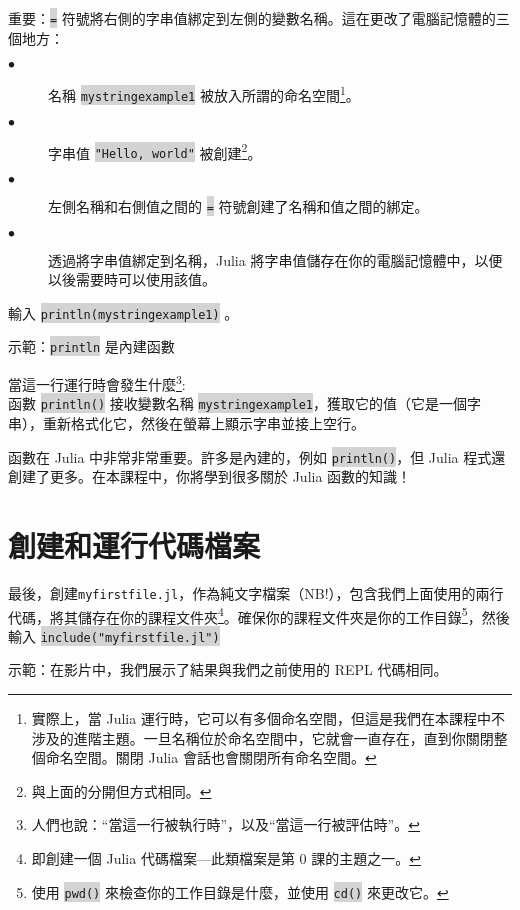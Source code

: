 \documentclass[]{article}
\newcommand{\codequote}[1]{\colorbox{lightgray}{\tt #1}}
\begin{document}
重要：\colorbox{lightgray}{\tt =} 符號將右側的字串值綁定到左側的變數名稱。這在更改了電腦記憶體的三個地方：
\begin{description}
	\item[$\bullet$] 名稱 \colorbox{lightgray}{\tt mystringexample1} 被放入所謂的命名空間\footnote{實際上，當 Julia 運行時，它可以有多個命名空間，但這是我們在本課程中不涉及的進階主題。一旦名稱位於命名空間中，它就會一直存在，直到你關閉整個命名空間。關閉 Julia 會話也會關閉所有命名空間。}。
  \item[$\bullet$] 字串值 \colorbox{lightgray}{\tt "Hello, world"} 被創建\footnote{ 與上面的分開但方式相同。}。
  \item[$\bullet$] 左側名稱和右側值之間的 \colorbox{lightgray}{\tt =} 符號創建了名稱和值之間的綁定。
 \item[$\bullet$] 透過將字串值綁定到名稱，Julia 將字串值儲存在你的電腦記憶體中，以便以後需要時可以使用該值。
\end{description}

\begin{minipage}{7cm}
輸入 \colorbox{lightgray}{\tt println(mystringexample1)} 。
\end{minipage}
\hspace{4em} \begin{minipage}{7cm}
	示範：\codequote{println} 是內建函數
\end{minipage}

當這一行運行時會發生什麼\footnote{人們也說：``當這一行被執行時''，以及``當這一行被評估時''。}:\\
函數 \colorbox{lightgray}{\tt println()} 接收變數名稱 \colorbox{lightgray}{\tt mystringexample1}，獲取它的值（它是一個字串），重新格式化它，然後在螢幕上顯示字串並接上空行。

函數在 Julia 中非常非常重要。許多是內建的，例如 \colorbox{lightgray}{\tt println()}，但 Julia 程式還創建了更多。在本課程中，你將學到很多關於 Julia 函數的知識！

\section*{創建和運行代碼檔案}

\begin{minipage}[t]{10.5cm}
	最後，創建{\tt myfirstfile.jl}，作為純文字檔案（NB!），包含我們上面使用的兩行代碼，將其儲存在你的課程文件夾\footnote{即創建一個 Julia 代碼檔案---此類檔案是第 0 課的主題之一。}。確保你的課程文件夾是你的工作目錄\footnote{使用 \colorbox{lightgray}{\tt pwd()} 來檢查你的工作目錄是什麼，並使用 \colorbox{lightgray}{\tt cd()} 來更改它。}，然後輸入 \colorbox{lightgray}{\tt include("myfirstfile.jl")}
	\end{minipage}
\hspace{4em} \begin{minipage}[t]{4.5cm}
示範：在影片中，我們展示了結果與我們之前使用的 REPL 代碼相同。
\end{minipage}
\end{document}
